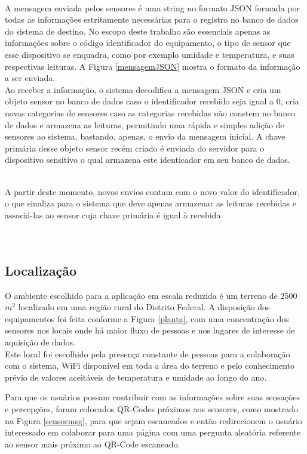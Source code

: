 \\\null \quad A mensagem enviada pelos sensores é uma string no formato JSON formada por todas as informações estritamente necessárias para o registro no banco de dados do sistema de destino.
No escopo deste trabalho são essenciais apenas as informações sobre o código identificador do equipamento, o tipo de sensor que esse dispositivo se enquadra, como por exemplo umidade e temperatura, e suas respectivas leituras. A Figura \ref{mensagemJSON} mostra o formato da informação a ser enviada.
\\\null \quad Ao receber a informação, o sistema decodifica a mensagem JSON e cria um objeto sensor no banco de dados caso o identificador recebido seja igual a 0, cria novas categorias de sensores caso as categorias recebidas não constem no banco de dados e armazena as leituras, permitindo uma rápida e simples adição de sensores ao sistema, bastando, apenas, o envio da mensagem inicial. A chave primária desse objeto sensor recém criado é enviada do servidor para o dispositivo sensitivo o qual armazena este identicador em seu banco de dados.

\\\null \quad A partir deste momento, novos envios contam com o novo valor do identificador, o que sinaliza para o sistema que deve apenas armazenar as leituras recebidas e associá-las ao sensor cuja chave primária é igual à recebida.
\\\\\\

\subsection{Localização}
\quad O ambiente escolhido para a aplicação em escala reduzida é um terreno de 2500 $m^2$ localizado em uma
região rural do Distrito Federal. A disposição dos equipamentos foi feita conforme a Figura \ref{planta},
com uma concentração dos sensores nos locais onde há maior fluxo de pessoas e nos lugares de interesse de
aquisição de dados.
\\\null \quad Este local foi escolhido pela presença constante de pessoas para a colaboração com o sistema, WiFi disponível em toda a área do terreno e pelo conhecimento prévio de valores aceitáveis de temperatura
  e umidade ao longo do ano.
\newpage

\newpage
Para que os usuários possam contribuir com as informações sobre suas sensações e percepções, foram colocados QR-Codes próximos aos sensores, como mostrado na Figura \ref{sensormsg}, para que sejam escaneados e então redirecionem o usuário interessado em colaborar para uma página com uma pergunta aleatória referente ao sensor mais próximo ao QR-Code escaneado.

